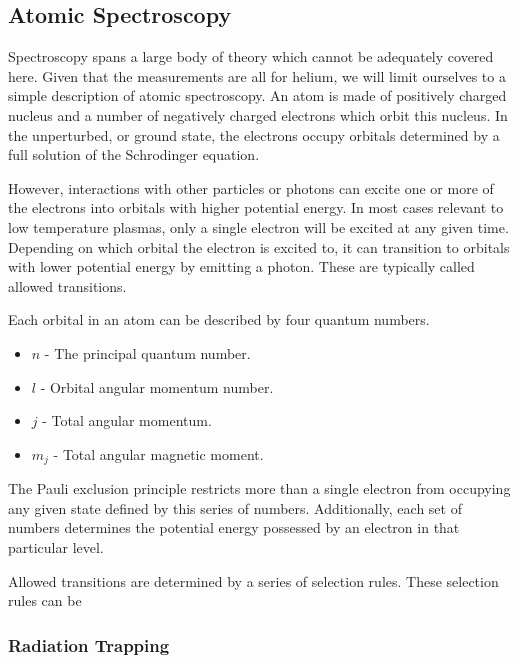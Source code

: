 \subsection{Atomic Spectroscopy}

Spectroscopy spans a large body of theory which cannot be adequately
covered here. Given that the measurements are all for helium, we will
limit ourselves to a simple description of atomic spectroscopy. An atom
is made of positively charged nucleus and a number of negatively charged
electrons which orbit this nucleus. In the unperturbed, or ground state,
the electrons occupy orbitals determined by a full solution of the
Schrodinger equation.

However, interactions with other particles or photons can excite one or
more of the electrons into orbitals with higher potential energy. In
most cases relevant to low temperature plasmas, only a single electron
will be excited at any given time. Depending on which orbital the
electron is excited to, it can transition to orbitals with lower
potential energy by emitting a photon. These are typically called
allowed transitions.

Each orbital in an atom can be described by four quantum numbers.
\begin{itemize}
  \item $n$ - The principal quantum number.
  \item $l$ - Orbital angular momentum number.
  \item $j$ - Total angular momentum.
  \item $m_j$ - Total angular magnetic moment.
\end{itemize}
The Pauli exclusion principle restricts more than a single electron from
occupying any given state defined by this series of numbers.
Additionally, each set of numbers determines the potential energy
possessed by an electron in that particular level. 

Allowed transitions are determined by a series of selection rules. These
selection rules can be 

\subsubsection{Radiation Trapping}

